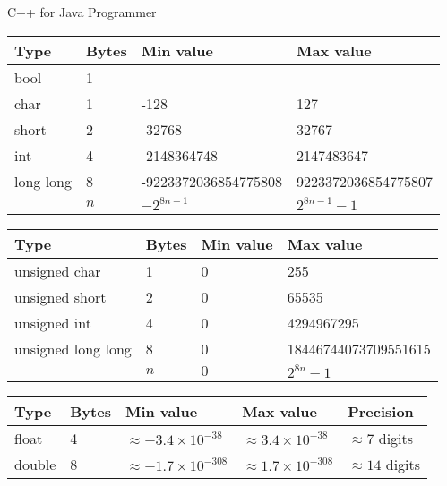 \documentclass[12pt,t]{beamer}
\begin{document}
\begin{frame}{C++ for Java Programmer}

    {\scriptsize
        \begin{center}
            \begin{tabular}{l|lll}
                Type & Bytes & Min value & Max value \\
                \hline
                bool & 1 & & \\
                char & 1 & -128 & 127 \\
                short & 2 & -32768 & 32767 \\
                int & 4 & -2148364748 & 2147483647 \\
                long long & 8 & -9223372036854775808 & 9223372036854775807 \\
                          & $n$ & $-2^{8n-1}$ & $2^{8n-1}-1$
            \end{tabular}
        \end{center}
    }

    {\scriptsize
        \begin{center}
            \begin{tabular}{l|lll}
                Type & Bytes & Min value & Max value \\
                \hline
                unsigned char & 1 & 0 & 255 \\
                unsigned short & 2 & 0 & 65535 \\
                unsigned int & 4 & 0 & 4294967295 \\
                unsigned long long & 8 & 0 & 18446744073709551615 \\
                    & $n$ & $0$ & $2^{8n}-1$
            \end{tabular}
        \end{center}
    }

    {\scriptsize
        \begin{center}
            \begin{tabular}{l|llll}
                Type & Bytes & Min value & Max value & Precision \\
                \hline
                float & 4 & $\approx -3.4\times 10^{-38}$ & $\approx 3.4\times 10^{-38}$ & $\approx 7$ digits \\
                double & 8 & $\approx -1.7\times 10^{-308}$ & $\approx 1.7\times 10^{-308}$ & $\approx 14$ digits \\
            \end{tabular}
        \end{center}
    }

\end{frame}
\end{document}
